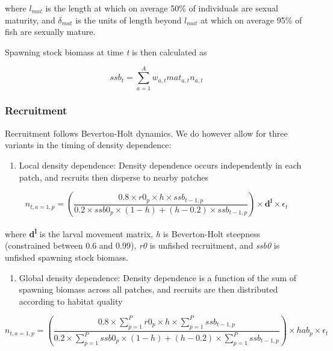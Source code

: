 \documentclass[]{article}
\providecommand{\tightlist}{%
  \setlength{\itemsep}{0pt}\setlength{\parskip}{0pt}}
\begin{document}
where \(l_{mat}\) is the length at which on average 50\% of individuals are sexual maturity, and \(\delta_{mat}\) is the units of length beyond \(l_{mat}\) at which on average 95\% of fish are sexually mature.

Spawning stock biomass at time \emph{t} is then calculated as

\begin{equation}
  ssb_t = \sum_{a=1}^Aw_{a,t}mat_{a,t}n_{a,t}
    \label{eq:ssb}
\end{equation}

\hypertarget{recruitment}{%
\subsubsection{Recruitment}\label{recruitment}}

Recruitment follows Beverton-Holt dynamics. We do however allow for three variants in the timing of density dependence:

\begin{enumerate}
\def\labelenumi{\arabic{enumi}.}
\tightlist
\item
  Local density dependence: Density dependence occurs independently in each patch, and recruits then disperse to nearby patches
\end{enumerate}

\begin{equation}
  n_{t,a = 1,p} = \left(\frac{0.8{\times}r0_{p}\times{h}\times{ssb_{t-1,p}}}{0.2\times{ssb0_p}\times(1 - h)+(h - 0.2)\times{ssb_{t-1,p}}}\right)\times \boldsymbol{d^l} \times \epsilon_t
  \label{eq:dd1}
\end{equation}

where \textbf{d\textsuperscript{l}} is the larval movement matrix, \emph{h} is Beverton-Holt steepness (constrained between 0.6 and 0.99), \emph{r0} is unfished recruitment, and \emph{ssb0} is unfished spawning stock biomass.

\begin{enumerate}
\def\labelenumi{\arabic{enumi}.}
\setcounter{enumi}{1}
\tightlist
\item
  Global density dependence: Density dependence is a function of the sum of spawning biomass across all patches, and recruits are then distributed according to habitat quality
\end{enumerate}

\begin{equation}
n_{t,a = 1,p} = \left(\frac{0.8{\times}\sum_{p=1}^P{r0_{p}}\times{h}\times\sum_{p=1}^P{ssb_{t-1,p}}}{0.2\times{\sum_{p=1}^Pssb0_p}\times(1 - h)+(h - 0.2)\times{\sum_{p=1}^Pssb_{t-1,p}}}\right)\times {hab_p} \times \epsilon_t
  \label{eq:dd2}
\end{equation}
\end{document}
